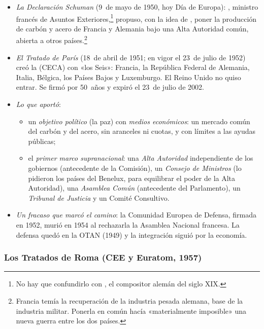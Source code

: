 \documentclass[11pt]{article}
\begin{document}
\begin{itemize}
\item \emph{La Declaración Schuman} (9~de mayo de 1950, hoy Día de Europa): , ministro francés de Asuntos Exteriores,\footnote{No hay que confundirlo con , el compositor alemán del siglo XIX.} propuso, con la idea de , poner la producción de carbón y acero de Francia y Alemania bajo una Alta Autoridad común, abierta a otros países\nocite{MangasLinan2016Instituciones}.\footnote{Francia temía la recuperación de la industria pesada alemana, base de la industria militar. Ponerla en común hacía «materialmente imposible» una nueva guerra entre los dos países.}
\item \emph{El Tratado de París} (18~de abril de 1951; en vigor el 23~de julio de 1952) creó la  (CECA) con «los Seis»: Francia, la República Federal de Alemania, Italia, Bélgica, los Países Bajos y Luxemburgo. El Reino Unido no quiso entrar. Se firmó por 50~años y expiró el 23~de julio de 2002.
\item \emph{Lo que aportó}:
  \begin{itemize}
  \item un \emph{objetivo político} (la paz) con \emph{medios económicos}: un mercado común del carbón y del acero, sin aranceles ni cuotas, y con límites a las ayudas públicas;
  \item el \emph{primer marco supranacional}: una \emph{Alta Autoridad} independiente de los gobiernos (antecedente de la Comisión), un \emph{Consejo de Ministros} (lo pidieron los países del Benelux, para equilibrar el poder de la Alta Autoridad), una \emph{Asamblea Común} (antecedente del Parlamento), un \emph{Tribunal de Justicia} y un Comité Consultivo.
  \end{itemize}
\item \emph{Un fracaso que marcó el camino}: la Comunidad Europea de Defensa, firmada en 1952, murió en 1954 al rechazarla la Asamblea Nacional francesa. La defensa quedó en la OTAN (1949) y la integración siguió por la economía.
\end{itemize}

\subsubsection{Los Tratados de Roma (CEE y Euratom, 1957)}\label{sec:roma}
\end{document}
